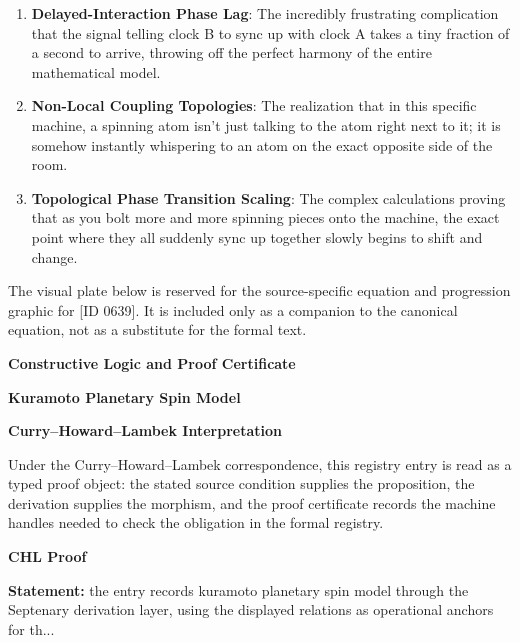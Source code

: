 \begin{enumerate}[leftmargin=1.6em,itemsep=6pt,topsep=4pt]
\item \textbf{Delayed-Interaction Phase Lag}: The incredibly frustrating complication that the signal telling clock B to sync up with clock A takes a tiny fraction of a second to arrive, throwing off the perfect harmony of the entire mathematical model.
\item \textbf{Non-Local Coupling Topologies}: The realization that in this specific machine, a spinning atom isn't just talking to the atom right next to it; it is somehow instantly whispering to an atom on the exact opposite side of the room.
\item \textbf{Topological Phase Transition Scaling}: The complex calculations proving that as you bolt more and more spinning pieces onto the machine, the exact point where they all suddenly sync up together slowly begins to shift and change.
\end{enumerate}

\begingroup\footnotesize\sloppy
The visual plate below is reserved for the source-specific equation and progression graphic for [ID 0639]. It is included only as a companion to the canonical equation, not as a substitute for the formal text.
\par\endgroup
\ifTZPDarkEdition
{}
\fi

\clearpage
\begingroup\tzpsupportsetup
\noindent\textbf{\fontsize{10.8pt}{12.8pt}\selectfont [ID 0639] Constructive Logic and Proof Certificate}\par
\noindent\textbf{\fontsize{10pt}{12pt}\selectfont Kuramoto Planetary Spin Model}\par
\vspace{0.45em}
\begingroup
\footnotesize
\setlength{\parskip}{0.22em}
\setlength{\parindent}{0pt}
\noindent\textbf{Curry--Howard--Lambek Interpretation}\par
Under the Curry--Howard--Lambek correspondence, this registry entry is read as a typed proof
object: the stated source condition supplies the proposition, the derivation supplies the
morphism, and the proof certificate records the machine handles needed to check the obligation
in the formal registry.

\vspace{0.45em}
\noindent\textbf{CHL Proof}\par
\textbf{Statement:} the entry records kuramoto planetary spin model through the Septenary derivation layer,
using the displayed relations as operational anchors for th...

